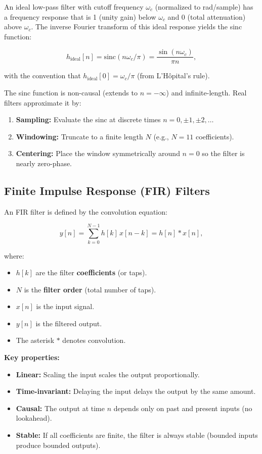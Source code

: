 \documentclass[11pt,letterpaper]{article}
\begin{document}
An ideal low-pass filter with cutoff frequency $\omega_c$ (normalized to rad/sample) has a frequency response that is 1 (unity gain) below $\omega_c$ and 0 (total attenuation) above $\omega_c$. The inverse Fourier transform of this ideal response yields the sinc function:

\begin{equation}
h_{\text{ideal}}[n] = \text{sinc}(n \omega_c / \pi) = \frac{\sin(n \omega_c)}{ \pi n},
\end{equation}

\noindent
with the convention that $h_{\text{ideal}}[0] = \omega_c / \pi$ (from L'Hôpital's rule).

\noindent
The sinc function is non-causal (extends to $n = -\infty$) and infinite-length. Real filters approximate it by:
\begin{enumerate}
    \item \textbf{Sampling:} Evaluate the sinc at discrete times $n = 0, \pm 1, \pm 2, \ldots$
    \item \textbf{Windowing:} Truncate to a finite length $N$ (e.g., $N = 11$ coefficients).
    \item \textbf{Centering:} Place the window symmetrically around $n = 0$ so the filter is nearly zero-phase.
\end{enumerate}

\subsection{Finite Impulse Response (FIR) Filters}

An FIR filter is defined by the convolution equation:

\begin{equation}
y[n] = \sum_{k=0}^{N-1} h[k] \, x[n-k] = h[n] * x[n],
\end{equation}

\noindent
where:
\begin{itemize}
    \item $h[k]$ are the filter \textbf{coefficients} (or taps).
    \item $N$ is the \textbf{filter order} (total number of taps).
    \item $x[n]$ is the input signal.
    \item $y[n]$ is the filtered output.
    \item The asterisk $*$ denotes convolution.
\end{itemize}

\noindent
\textbf{Key properties:}
\begin{itemize}
    \item \textbf{Linear:} Scaling the input scales the output proportionally.
    \item \textbf{Time-invariant:} Delaying the input delays the output by the same amount.
    \item \textbf{Causal:} The output at time $n$ depends only on past and present inputs (no lookahead).
    \item \textbf{Stable:} If all coefficients are finite, the filter is always stable (bounded inputs produce bounded outputs).
\end{itemize}
\end{document}
